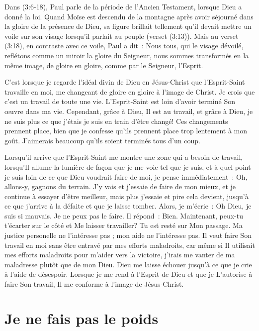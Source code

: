Dans (3:6-18), Paul parle de la période
 de l'Ancien Testament, lorsque Dieu a donné la loi.
 Quand Moïse est descendu de la montagne après avoir séjourné
 dans la gloire de la présence de Dieu,
 sa figure brillait tellement qu'il devait mettre un voile sur son visage
 lorsqu'il parlait au peuple (verset (3:13)).
 Mais au verset (3:18), en contraste avec ce voile,
 Paul a dit~:
 \og Nous tous, qui le visage dévoilé, reflétons comme un miroir
 la gloire du Seigneur, nous sommes transformés en la même image,
 de gloire en gloire, comme par le Seigneur,
 l'Esprit. \fg{}

C'est lorsque je regarde l'idéal divin de Dieu en Jésus-Christ
 que l'Esprit-Saint travaille en moi, me changeant de gloire en gloire
 à l'image de Christ.
 Je crois que c'est un travail de toute une vie.
 L'Es\-prit-Saint est loin d'avoir terminé Son œuvre dans ma vie.
 Cependant, grâce à Dieu, Il est au travail, et grâce à Dieu,
 je ne suis plus ce que j'étais
 \ocadr je suis en train d'être changé!
 Ces changements prennent place, bien que je confesse qu'ils prennent place
 trop lentement à mon goût.
 J'aimerais beaucoup qu'ils soient terminés tous d'un coup.

Lorsqu'il arrive que l'Esprit-Saint me montre une zone qui a besoin de travail,
 lorsqu'Il allume la lumière de façon que je me voie tel que je suis,
 et à quel point je suis loin de ce que Dieu voudrait faire de moi,
 je pense immédiatement~:
 \og Oh, allons-y, gagnons du terrain. \fg{}
 J'y vais et j'essaie de faire de mon mieux,
 et je continue à essayer d'être meilleur,
 mais plus j'essaie et pire cela devient,
 jusqu'à ce que j'arrive à la défaite et que je laisse tomber.
 Alors, je m'écrie~:
 \og Oh Dieu, je suis si mauvais. Je ne peux pas le faire. \fg{}
 Il répond~:
 \og Bien. Maintenant, peux-tu t'écarter sur le côté et Me laisser travailler?
 Tu est resté sur Mon passage. \fg{}
 Ma justice personelle ne l'intéresse pas ;
 mon aide ne l'intéresse pas.
 Il veut faire Son travail en moi sans être entravé
 par mes efforts maladroits,
 car même si Il utilisait mes efforts maladroits
 pour m'aider vers la victoire,
 j'irais me vanter de ma maladresse plutôt que de mon Dieu.
 Dieu me laisse échouer jusqu'à ce que je crie à l'aide de désespoir.
 Lorsque je me rend à l'Esprit de Dieu et que je L'autorise
 à faire Son travail, Il me conforme à l'image de Jésus-Christ.


\section*{Je ne fais pas le poids}

